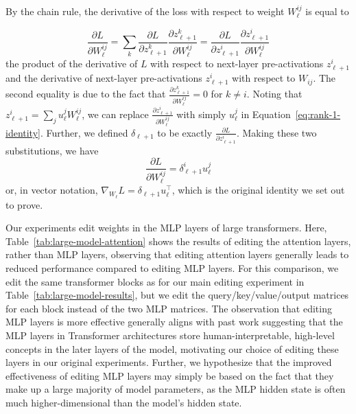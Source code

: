 \documentclass{article}
\makeatletter
\newcommand{\rebuttal}[1]{#1}
\let\origsection\section
\renewcommand\section{\@ifstar{\starsection}{\nostarsection}}
\newcommand\nostarsection[1]
{\sectionprelude\origsection{#1}\sectionpostlude}
\newcommand\starsection[1]
{\sectionprelude\origsection*{#1}\sectionpostlude}
\newcommand\sectionprelude{%
  \vspace{-1.5mm}
}
\newcommand\sectionpostlude{%
  \vspace{-2mm}
}
\makeatother
\begin{document}
\begin{appendix}
By the chain rule, the derivative of the loss with respect to weight $W_\ell^{ij}$ is equal to

\begin{equation}
    \label{eq:rank-1-identity}
    \frac{\partial L}{\partial W_\ell^{ij}} = \sum_k\frac{\partial L}{\partial z_{\ell+1}^k}\frac{\partial z_{\ell+1}^k}{\partial W_\ell^{ij}} = \frac{\partial L}{\partial z_{\ell+1}^i}\frac{\partial z_{\ell+1}^i}{\partial W_\ell^{ij}}
\end{equation}
the product of the derivative of $L$ with respect to next-layer pre-activations $z_{\ell+1}^i$ and the derivative of next-layer pre-activations $z_{\ell+1}^i$ with respect to $W_{ij}$. The second equality is due to the fact that $\frac{\partial z_{\ell+1}^k}{\partial W_\ell^{ij}} = 0$ for $k \neq i$. Noting that $z_{\ell+1}^i = \sum_j u_\ell^j W_\ell^{ij}$, we can replace $\frac{\partial z_{\ell+1}^i}{\partial W_\ell^{ij}}$ with simply $u_\ell^j$ in Equation~\ref{eq:rank-1-identity}. Further, we defined $\delta_{\ell+1}$ to be exactly $\frac{\partial L}{\partial z_{\ell+1}^i}$. Making these two substitutions, we have
\begin{equation}
    \frac{\partial L}{\partial W_\ell^{ij}} = \delta_{\ell+1}^i u_\ell^j
\end{equation}
or, in vector notation, $\nabla_{W_\ell}L = \delta_{\ell+1}u_\ell^\top$, which is the original identity we set out to prove.

\section{\rebuttal{Editing attention parameters}}
\label{sec:attention-editing}

Our experiments edit weights in the MLP layers of large transformers. Here, Table~\ref{tab:large-model-attention} shows the results of editing the attention layers, rather than MLP layers, observing that editing attention layers generally leads to reduced performance compared to editing MLP layers. For this comparison, we edit the same transformer blocks as for our main editing experiment in Table~\ref{tab:large-model-results}, but we edit the query/key/value/output matrices for each block instead of the two MLP matrices. The observation that editing MLP layers is more effective generally aligns with past work \citep{Geva2021TransformerFL} suggesting that the MLP layers in Transformer architectures store human-interpretable, high-level concepts in the later layers of the model, motivating our choice of editing these layers in our original experiments. Further, we hypothesize that the improved effectiveness of editing MLP layers may simply be based on the fact that they make up a large majority of model parameters, as the MLP hidden state is often much higher-dimensional than the model's hidden state.


\end{appendix}
\end{document}
